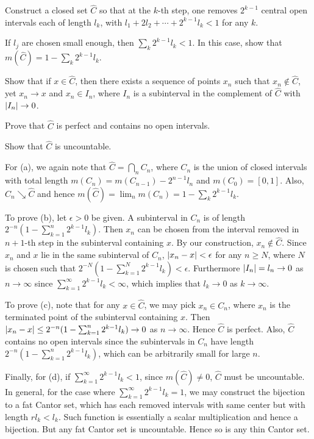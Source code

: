 \begin{exercise}
    Construct a closed set $\hat{C}$ so that at the $k$-th step,
    one removes $2^{k-1}$ central open intervals each of length 
    $l_k$, with $l_1 + 2l_2 + \cdots + 2^{k-1}l_k < 1$ for any 
    $k$. 
    \begin{thmenum}
        \item If $l_j$ are chosen small enough, then 
        $\sum_k 2^{k-1}l_k < 1$. In this case, show that 
        $m(\hat{C}) = 1 - \sum_k 2^{k-1}l_k$.
        \item Show that if $x\in\hat{C}$, then there exists a 
        sequence of points $x_n$ such that $x_n\not\in\hat{C}$, 
        yet $x_n\to x$ and $x_n\in I_n$, where $I_n$ is a 
        subinterval in the complement of $\hat{C}$ with 
        $\left\lvert {I_n} \right\rvert\to 0$.
        \item Prove that $\hat{C}$ is perfect and contains no 
        open intervals. 
        \item Show that $\hat{C}$ is uncountable.
    \end{thmenum}
\end{exercise}
\begin{pf}
    For (a), we again note that $\hat{C} = \bigcap_n C_n$, 
    where $C_n$ is the union of closed intervals with total 
    length $m(C_n) = m(C_{n-1})-2^{n-1}l_n$ and $m(C_0) 
    = [0,1]$. Also, $C_n\searrow\hat{C}$ and hence $m(\hat{C}) 
    = \lim_n m(C_n) = 1 - \sum_k 2^{k-1}l_k$.

    To prove (b), let $\epsilon>0$ be given. A subinterval in 
    $C_n$ is of length $2^{-n}(1 - \sum_{k=1}^n 2^{k-1}l_k)$. 
    Then $x_n$ can be chosen from the interval removed in 
    $n+1$-th step in the subinterval containing $x$. By our 
    construction, $x_n\not\in\hat{C}$. Since $x_n$ and $x$ lie
    in the same subinterval of $C_n$, $\left\lvert {x_n-x} \right\rvert<\epsilon$ 
    for any $n\geq N$, where $N$ is chosen such that 
    $2^{-N}(1 - \sum_{k=1}^N 2^{k-1}l_k) < \epsilon$. 
    Furthermore $\left\lvert {I_n} \right\rvert=l_n\to 0$ as $n\to\infty$ since 
    $\sum_{k=1}^\infty 2^{k-1}l_k<\infty$, which implies that 
    $l_k\to 0$ as $k\to\infty$.

    To prove (c), note that for any 
    $x\in\hat{C}$, we may pick $x_n\in C_n$, where $x_n$ is 
    the terminated point of the subinterval containing $x$. 
    Then $\left\lvert {x_n-x} \right\rvert\leq 2^{-n}(1 - \sum_{k=1}^n 2^{k-1}l_k)
    \to 0$ as $n\to\infty$. Hence $\hat{C}$ is perfect. Also, 
    $\hat{C}$ contains no open intervals since the 
    subintervals in $C_n$ have length 
    $2^{-n}(1 - \sum_{k=1}^n 2^{k-1}l_k)$, which can be 
    arbitrarily small for large $n$.

    Finally, for (d), if $\sum_{k=1}^{\infty}2^{k-1}l_k<1$,
    since $m(\hat{C})\neq 0$, $\hat{C}$ must be uncountable.
    In general, for the case where 
    $\sum_{k=1}^{\infty}2^{k-1}l_k=1$, we may construct the 
    bijection to a fat Cantor set, which has each removed 
    intervals with same center but with length $rl_k<l_k$. 
    Such function is essentially a scalar multiplication and
    hence a bijection. But any fat Cantor set is uncountable.
    Hence so is any thin Cantor set.
\end{pf}

